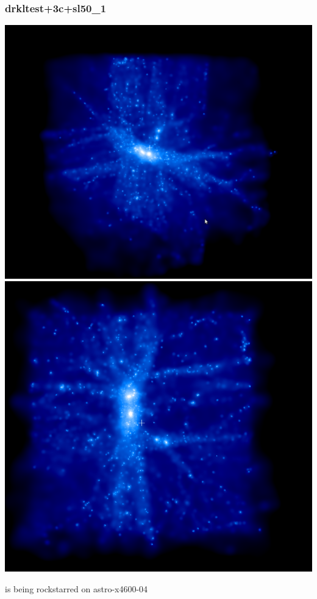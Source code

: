 \documentclass[a4paper,11pt,fleqn,oneside]{book}
\begin{document}
\newpage
\subsubsection{drkltest+3c+sl50\_1}


\includegraphics[scale=0.2]{drkltest+3c+sl50_1/1.png} 
\includegraphics[scale=0.2]{drkltest+3c+sl50_1/2.png}

is being rockstarred on astro-x4600-04 
\end{document}
